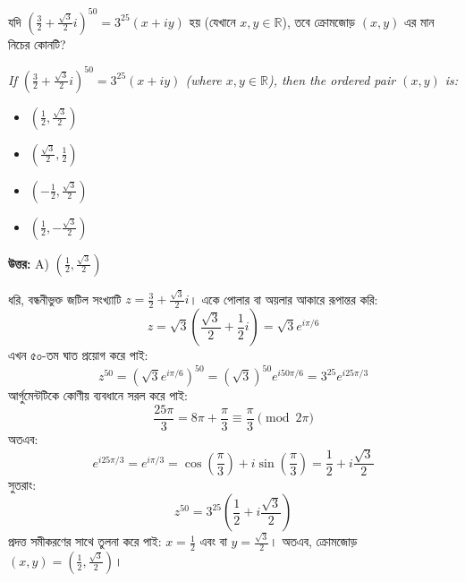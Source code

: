 \documentclass[12pt, a4paper]{article}
\begin{document}
\vspace{1em}

\begin{tcolorbox}[questionbox={প্রশ্ন (Question) 17}]
    \noindent
    যদি $\left(\frac{3}{2} + \frac{\sqrt{3}}{2}i\right)^{50} = 3^{25}(x + iy)$ হয় (যেখানে $x, y \in \mathbb{R}$), তবে ক্রোমজোড় $(x, y)$ এর মান নিচের কোনটি?
    
    \vspace{0.8em}
    \begin{english}
    \noindent\textit{\color{darkgray}
    If $\left(\frac{3}{2} + \frac{\sqrt{3}}{2}i\right)^{50} = 3^{25}(x + iy)$ (where $x, y \in \mathbb{R}$), then the ordered pair $(x, y)$ is:
    }
    \end{english}
\end{tcolorbox}

\begin{itemize}[label={}, leftmargin=1cm, itemsep=0.5em]
    \item[\textbf{A)}] $\left(\frac{1}{2}, \frac{\sqrt{3}}{2}\right)$
    \item[\textbf{B)}] $\left(\frac{\sqrt{3}}{2}, \frac{1}{2}\right)$
    \item[\textbf{C)}] $\left(-\frac{1}{2}, \frac{\sqrt{3}}{2}\right)$
    \item[\textbf{D)}] $\left(\frac{1}{2}, -\frac{\sqrt{3}}{2}\right)$
\end{itemize}

\vspace{0.5em}
\begin{tcolorbox}[answerbox]
    \textbf{\color{success} উত্তর:} A) $\left(\frac{1}{2}, \frac{\sqrt{3}}{2}\right)$
\end{tcolorbox}
\vspace{1em}

\begin{tcolorbox}[solutionbox={সমাধান (Solution)}]
    \noindent
    ধরি, বন্ধনীভুক্ত জটিল সংখ্যাটি $z = \frac{3}{2} + \frac{\sqrt{3}}{2}i$। একে পোলার বা অয়লার আকারে রূপান্তর করি:
    \[ z = \sqrt{3}\left(\frac{\sqrt{3}}{2} + \frac{1}{2}i\right) = \sqrt{3} e^{i\pi/6} \]
    এখন ৫০-তম ঘাত প্রয়োগ করে পাই:
    \[ z^{50} = (\sqrt{3} e^{i\pi/6})^{50} = (\sqrt{3})^{50} e^{i 50\pi/6} = 3^{25} e^{i 25\pi/3} \]
    আর্গুমেন্টটিকে কোণীয় ব্যবধানে সরল করে পাই:
    \[ \frac{25\pi}{3} = 8\pi + \frac{\pi}{3} \equiv \frac{\pi}{3} \pmod{2\pi} \]
    অতএব:
    \[ e^{i 25\pi/3} = e^{i\pi/3} = \cos\left(\frac{\pi}{3}\right) + i\sin\left(\frac{\pi}{3}\right) = \frac{1}{2} + i\frac{\sqrt{3}}{2} \]
    সুতরাং:
    \[ z^{50} = 3^{25}\left(\frac{1}{2} + i\frac{\sqrt{3}}{2}\right) \]
    প্রদত্ত সমীকরণের সাথে তুলনা করে পাই: $x = \frac{1}{2}$ এবং বা $y = \frac{\sqrt{3}}{2}$। অতএব, ক্রোমজোড় $(x, y) = \left(\frac{1}{2}, \frac{\sqrt{3}}{2}\right)$।
\end{tcolorbox}
\end{document}
